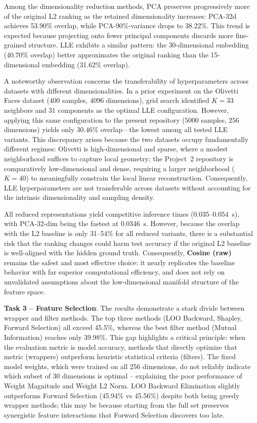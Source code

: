 \documentclass[onecolumn,a4paper,12pt]{IEEEtran}
\begin{document}
Among the dimensionality reduction methods, PCA preserves progressively more of the original L2 ranking as the retained dimensionality increases: PCA-32d achieves 53.90\% overlap, while PCA-90\%-variance drops to 38.22\%. This trend is expected because projecting onto fewer principal components discards more fine-grained structure. LLE exhibits a similar pattern: the 30-dimensional embedding (40.70\% overlap) better approximates the original ranking than the 15-dimensional embedding (31.62\% overlap).

A noteworthy observation concerns the transferability of hyperparameters across datasets with different dimensionalities. In a prior experiment on the Olivetti Faces dataset ($400$ samples, $4096$ dimensions), grid search identified $K=33$ neighbors and $31$ components as the optimal LLE configuration. However, applying this same configuration to the present repository ($5000$ samples, $256$ dimensions) yields only $30.46\%$ overlap---the lowest among all tested LLE variants. This discrepancy arises because the two datasets occupy fundamentally different regimes: Olivetti is high-dimensional and sparse, where a modest neighborhood suffices to capture local geometry; the Project~2 repository is comparatively low-dimensional and dense, requiring a larger neighborhood ($K=40$) to meaningfully constrain the local linear reconstruction. Consequently, LLE hyperparameters are not transferable across datasets without accounting for the intrinsic dimensionality and sampling density.

All reduced representations yield competitive inference times (0.035--0.054~s), with PCA-32-dim being the fastest at 0.0346~s. However, because the overlap with the L2 baseline is only 31--54\% for all reduced variants, there is a substantial risk that the ranking changes could harm test accuracy if the original L2 baseline is well-aligned with the hidden ground truth. Consequently, \textbf{Cosine (raw)} remains the safest and most effective choice: it nearly replicates the baseline behavior with far superior computational efficiency, and does not rely on unvalidated assumptions about the low-dimensional manifold structure of the feature space.

\textbf{Task 3 -- Feature Selection}: The results demonstrate a stark divide between wrapper and filter methods. The top three methods (LOO Backward, Shapley, Forward Selection) all exceed 45.5\%, whereas the best filter method (Mutual Information) reaches only 39.98\%. This gap highlights a critical principle: when the evaluation metric is model accuracy, methods that directly optimize that metric (wrappers) outperform heuristic statistical criteria (filters). The fixed model weights, which were trained on all 256 dimensions, do not reliably indicate which subset of 30 dimensions is optimal -- explaining the poor performance of Weight Magnitude and Weight L2 Norm. LOO Backward Elimination slightly outperforms Forward Selection (45.94\% vs 45.56\%) despite both being greedy wrapper methods; this may be because starting from the full set preserves synergistic feature interactions that Forward Selection discovers too late.
\end{document}
